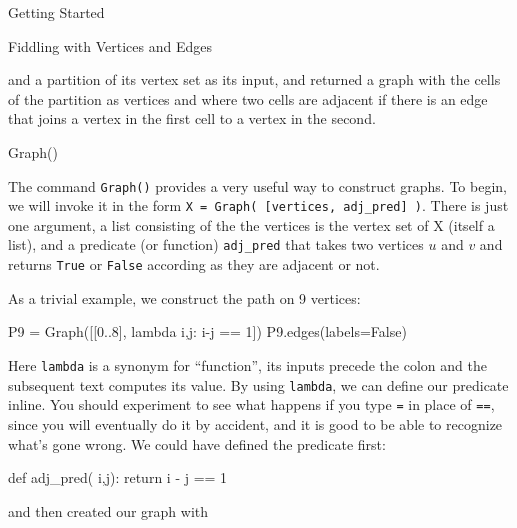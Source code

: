 \begin{chap}{Getting Started}
\begin{sect}{Fiddling with Vertices and Edges}
\begin{para}
and a partition of its vertex set as its input, and returned
a graph with the cells of the partition as vertices and where
two cells are adjacent if there is an edge that joins a vertex
in the first cell to a vertex in the second.
\end{para}
%
\end{sect}
%
\begin{sect}{Graph()}
%
\begin{para}
The command \verb|Graph()| provides a very useful way to construct graphs.
To begin, we will invoke it in the form \verb|X = Graph( [vertices, adj_pred] )|.
There is just one argument, a list consisting of the
the vertices is the vertex set of X (itself a list), and a predicate (or function)
\verb|adj_pred| that takes two vertices $u$ and $v$ and returns \verb|True| or
\verb|False| according as they are adjacent or not.
\end{para}
%
\begin{para}
As a trivial example, we construct the path on 9 vertices:
\end{para}
%
\begin{sagecode}
\begin{sageinput}
P9 = Graph([[0..8], lambda i,j: i-j == 1])
P9.edges(labels=False)
\end{sageinput}
\begin{sageoutput}
[(0, 1), (1, 2), (2, 3), (3, 4), (4, 5), (5, 6), (6, 7), (7, 8)]
\end{sageoutput}
\end{sagecode}
%
\begin{para}
Here \verb|lambda| is a synonym for ``function'', its inputs precede the colon
and the subsequent text computes its value. By using \verb|lambda|, we can define
our predicate inline. You should experiment to see what happens if you type 
\verb|=| in place of \verb|==|, since you will eventually do it by accident, 
and it is good to be able to recognize what's gone wrong.
We could have defined the predicate first:
\end{para}
%
\begin{sagecode}
\begin{sageinput}
def adj_pred( i,j):
    return i - j == 1
\end{sageinput}
\begin{sageoutput}
\end{sageoutput}
\end{sagecode}
%
\begin{para}
and then created our graph with
\end{para}

\end{sect}
\end{chap}
